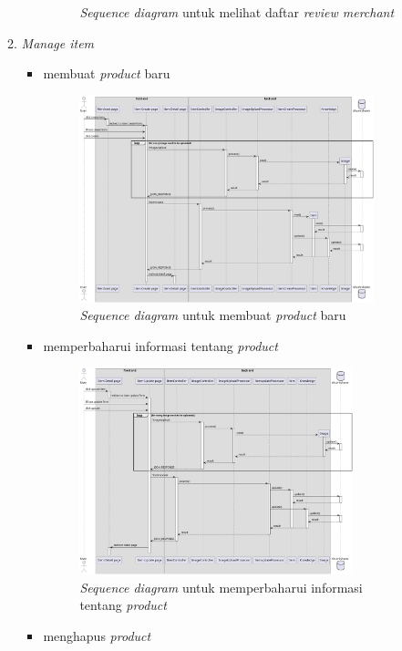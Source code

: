 \documentclass[a4paper]{article}
\begin{document}
\begin{enumerate}
\begin{enumerate}
\begin{itemize}
\begin{figure}[h]
                \caption{\textit{Sequence diagram} untuk melihat daftar \textit{review merchant} }
            \end{figure}
        \end{itemize}

        \item \textit{Manage item}
        \begin{itemize}
            \item membuat \textit{product} baru
            \begin{figure}[h]
                \centering
                \includegraphics*[height=6cm]{./diagram/sequence diagram/17. item/create item/create item.png}
                \caption{\textit{Sequence diagram} untuk membuat \textit{product} baru}
            \end{figure}
            \newpage
            \item memperbaharui informasi tentang \textit{product}
            \begin{figure}[h]
                \centering
                \includegraphics*[height=6cm]{./diagram/sequence diagram/17. item/update item/update item.png}
                \caption{\textit{Sequence diagram} untuk memperbaharui informasi tentang \textit{product}}
            \end{figure}
            \item menghapus \textit{product}

\end{itemize}
\end{enumerate}
\end{enumerate}
\end{document}
